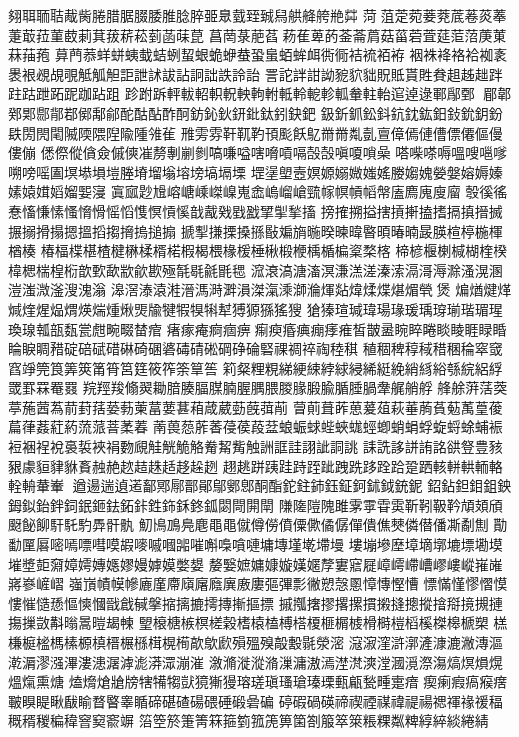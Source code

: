 翗聑聏聐胾胔腃腊腒腏腇脽腍脺臦臮臷臸臹舄舼舽舿艵茻
菏菹萣菀菨萒菧菤菼菶萐菆菈菫菣莿萁菝菥菘菿菡菋菎
菖菵菉萉萏菞萑萆菂菳菕菺菇菑菪萓莚菃菬菮菄菻菗菢
萛菛菾蛘蛢蛦蛓蛣蛚蛪蛝蛫蛜蛬蛩蛗蛨蛑衈衖衕袺裗袹袸
裀袾袶袼袷袽袲褁裉覕覘覗觝觚觛詎詍訹詙詀詗詘詄詅詒
詈詑詊詌詏豟貁貀貺貾貰貹貵趄趀趉跘跓跍跇跖跜跏跕跙
跈跗跅軯軷軺軹軦軮軥軵軧軨軶軫軱軬軴軩逭逴逯鄆鄬鄄
郿郼鄈郹郻鄁鄀鄇鄅鄃酡酤酟酢酠鈁鈊鈥鈃鈚鈦鈏鈌鈀
鈒釿釽鈆鈄鈧鈂鈜鈤鈙鈗鈅鈖镻閍閌閐隇陾隈隉隃隀雂雈
雃雱雰靬靰靮頇颩飫鳦⿋黹亃亄亶傽傿僆傮僄僊傴僈僂傰
僁傺傱僋僉傶傸凗剺剸剻剼嗃嗛嗌嗐嗋嗊嗝嗀嗀嗔嗄嗩喿
嗒喍嗏嗕嗢嗖嗈嗲嗍嗙嗂圔塓塨塤塏塍塉塯塕塎塝塙塥塛
堽塣塱壼嫇嫄嫋媺媸媱媵媰媿嫈媻嫆媷嫀嫊媴媶嫍媹媐寖
寘寙尟尳嵱嵣嵊嵥嵲嵬嵞嵨嵧嵢巰幏幎幊幍幋廅廌廆廋廇
彀徯徭惷慉慊愫慅愶愲愮慆愯慏愩慀戠酨戣戥戤揅揱揫搐
搒搉搠搤搳摃搟搕搘搹搷搢搣搌搦搰搨摁搵搯搊搚摀搥搧
搋揧搛搮搡搎敯斒旓暆暌暕暐暋暊暙暔晸朠楦楟椸楎楢楱
椿楅楪椹楂楗楙楺楈楉椵楬椳椽楥棰楸椴楩楀楯楄楶楘楁
楴楌椻楋椷楜楏楑椲楒椯楻椼歆歅歃歂歈歁殛毻毼毹毷毸
溛滖滈溏滀溟溓溔溠溱溹滆滒溽滁溞滉溷溰滍溦滏溲溾滃
滜滘溙溒溎溍溤溡溿溳滐滊溗溮溣煇煔煒煣煠煁煝煢煲
煸煪煡煂煘煃煋煰煟煐煓煄煍煚牏犍犌犑犐犎猼獂猻猺獀
獊獉瑄瑊瑋瑒瑑瑗瑀瑏瑐瑎瑂瑆瑍瑔瓡瓿瓾瓽甝畹畷榃痯
瘏瘃痷痾痼痹痸瘐痻痶痭痵痽皙皵盝睕睟睠睒睖睚睩睧
睔睙睭矠碇碚碔碏碄碕碅碆碡碃硹碙碀碖硻祼禂祽祹稑稘
稙稒稗稕稢稓稛稐窣窢窞竫筦筤筭筴筩筲筥筳筱筰筡筸筶
筣粲粴粯綈綆綀綍絿綅絺綎絻綃絼綌綔綄絽綒罭罫罧罨罬
羦羥羧翛翜耡腤腠腷腜腩腛腢腲朡腞腶腧腯腄腡舝艉艄艀
艂艅蓱萿葖葶葹蒏蒍葥葑葀蒆葧萰葍葽葚葙葴葳葝蔇葞萷
萺萴葺葃葸萲葅萩菙葋萯葂萭葟葰萹葎葌葒葯蓅蒎萻葇萶
萳葨葾葄萫葠葔葮葐蜋蜄蛷蜌蛺蛖蛵蝍蛸蜎蜉蜁蛶蜍蜅裖
裋裍裎裞裛裚裌裐覅覛觟觥觤觡觠觢觜触詶誆詿詡訿詷誂
誄詵誃誁詴詺谼豋豊豥豤豦貆貄貅賌赨赩趑趌趎趏趍趓趔
趐趒跰跠跬跱跮跐跩跣跢跧跲跫跴輆軿輁輀輅輇輈輂輋
遒逿遄遉逽鄐鄍鄏鄑鄖鄔鄋鄎酮酯鉈鉒鈰鈺鉦鈳鉥鉞銃鈮
鉊鉆鉭鉬鉏鉠鉧鉯鈶鉡鉰鈱鉔鉣鉐鉲鉎鉓鉌鉖鈲閟閜閞閛
隒隓隑隗雎雺雽雸雵靳靷靸靲頏頍頎颬飶飹馯馲馰馵骭骫
魛鳪鳭鳧麀⿌黽僦僔僗僨僳僛僪僝僤僓僬僰僯僣僠凘劀劁
勩勫匰厬嘧嘕嘌嘒嗼嘏嘜嘁嘓嘂嗺嘝嘄嗿嗹墉塼墐墘墆墁
塿塴墋塺墇墑墎塶墂墈塻墔墏壾奫嫜嫮嫥嫕嫪嫚嫭嫫嫳嫢
嫠嫛嫬嫞嫝嫙嫨嫟孷寠寣屣嶂嶀嵽嶆嵺嶁嵷嶊嶉嶈嵾嵼嶍
嵹嵿幘幙幓廘廑廗廎廜廕廙廒廔彄彃彯徶愬愨慁慞慱慳慒
慓慲慬憀慴慔慺慛慥愻慪慡慖戩戧戫搫摍摛摝摴摶摲摳摽
摵摦撦摎撂摞摜摋摓摠摐摿搿摬摫摙摥摷敳斠暡暠暟朅朄
朢榱榶槉榠槎榖榰榬榼榑榙榎榧榍榩榾榯榿槄榽榤槔榹槊
榚槏榳榓榪榡榞槙榗榐槂榵榥槆歊歍歋殞殟殠毃毄毾滎滵
滱漃漥滸漷滻漮漉潎漙漚漧漘漻漒滭漊漶潳滹滮漭潀漰漼
漵滫漇漎潃漅滽滶漹漜滼漺漟漍漞漈漡熇熐熉熀熅熂熏煻
熆熁熗牄牓犗犕犓獃獍獑獌瑢瑳瑱瑵瑲瑧瑮甀甂甃畽疐瘖
瘈瘌瘕瘑瘊瘔皸瞁睼瞅瞂睮瞀睯睾瞃碲碪碴碭碨硾碫碞碥
碠碬碢碤禘禊禋禖禕禔禓禗禈禒禐稫穊稰稯稨稦窨窫窬竮
箈箜箊箑箐箖箍箌箛箎箅箘劄箙箤箂粻粿粼粺綧綷緂綣綪

